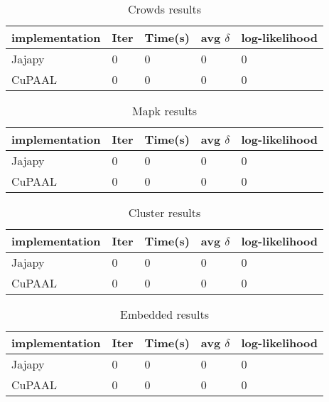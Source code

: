 \begin{table}[!htb]
    \centering
    \caption{Crowds results}
    \label{tab:crowds_results}
    \begin{tabular}{lllll}
        \toprule
        implementation & Iter & Time(s) & avg $\delta$ & log-likelihood \\
        \midrule
        Jajapy         & 0    & 0       & 0            & 0              \\
        CuPAAL         & 0    & 0       & 0            & 0              \\
        \bottomrule
    \end{tabular}
\end{table}

\begin{table}[!htb]
    \centering
    \caption{Mapk results}
    \label{tab:mapk_results}
    \begin{tabular}{lllll}
        \toprule
        implementation & Iter & Time(s) & avg $\delta$ & log-likelihood \\
        \midrule
        Jajapy         & 0    & 0       & 0            & 0              \\
        CuPAAL         & 0    & 0       & 0            & 0              \\
        \bottomrule
    \end{tabular}
\end{table}

\begin{table}[!htb]
    \centering
    \caption{Cluster results}
    \label{tab:cluster_results}
    \begin{tabular}{lllll}
        \toprule
        implementation & Iter & Time(s) & avg $\delta$ & log-likelihood \\
        \midrule
        Jajapy         & 0    & 0       & 0            & 0              \\
        CuPAAL         & 0    & 0       & 0            & 0              \\
        \bottomrule
    \end{tabular}
\end{table}

\begin{table}[!htb]
    \centering
    \caption{Embedded results}
    \label{tab:embedded_results}
    \begin{tabular}{lllll}
        \toprule
        implementation & Iter & Time(s) & avg $\delta$ & log-likelihood \\
        \midrule
        Jajapy         & 0    & 0       & 0            & 0              \\
        CuPAAL         & 0    & 0       & 0            & 0              \\
        \bottomrule
    \end{tabular}
\end{table}

